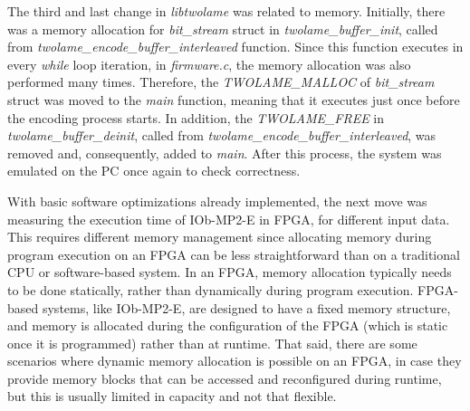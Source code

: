 The third and last change in \textit{libtwolame} was related to memory.
Initially, there was a memory allocation for \textit{bit\_stream} struct in \textit{twolame\_buffer\_init}, called from \textit{twolame\_encode\_buffer\_interleaved} function. Since this function executes in every \textit{while} loop iteration, in \textit{firmware.c}, the memory allocation was also performed many times.
Therefore, the \textit{TWOLAME\_MALLOC} of \textit{bit\_stream} struct was moved to the \textit{main} function, meaning that it executes just once before the encoding process starts.
In addition, the \textit{TWOLAME\_FREE} in \textit{twolame\_buffer\_deinit}, called from \textit{twolame\_encode\_buffer\_interleaved}, was removed and, consequently, added to \textit{main}. 
After this process, the system was emulated on the PC once again to check correctness.

With basic software optimizations already implemented, the next move was measuring the execution time of IOb-MP2-E in FPGA, for different input data. 
This requires different memory management since allocating memory during program execution on an FPGA can be less straightforward than on a traditional CPU or software-based system. In an FPGA, memory allocation typically needs to be done statically, rather than dynamically during program execution. FPGA-based systems, like IOb-MP2-E, are designed to have a fixed memory structure, and memory is allocated during the configuration of the FPGA (which is static once it is programmed) rather than at runtime. 
That said, there are some scenarios where dynamic memory allocation is possible on an FPGA, in case they provide memory blocks that can be accessed and reconfigured during runtime, but this is usually limited in capacity and not that flexible.

